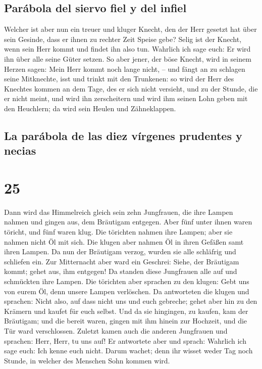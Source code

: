 \hypertarget{paruxe1bola-del-siervo-fiel-y-del-infiel}{%
\subsection{Parábola del siervo fiel y del
infiel}\label{paruxe1bola-del-siervo-fiel-y-del-infiel}}

 Welcher ist aber nun ein treuer und kluger Knecht, den
der Herr gesetzt hat über sein Gesinde, dass er ihnen zu rechter Zeit
Speise gebe?  Selig ist der Knecht, wenn sein Herr kommt
und findet ihn also tun.  Wahrlich ich sage euch: Er wird
ihn über alle seine Güter setzen.  So aber jener, der
böse Knecht, wird in seinem Herzen sagen: Mein Herr kommt noch lange
nicht, --  und fängt an zu schlagen seine Mitknechte,
isst und trinkt mit den Trunkenen:  so wird der Herr des
Knechtes kommen an dem Tage, des er sich nicht versieht, und zu der
Stunde, die er nicht meint,  und wird ihn zerscheitern
und wird ihm seinen Lohn geben mit den Heuchlern; da wird sein Heulen
und Zähneklappen.

\hypertarget{la-paruxe1bola-de-las-diez-vuxedrgenes-prudentes-y-necias}{%
\subsection{La parábola de las diez vírgenes prudentes y
necias}\label{la-paruxe1bola-de-las-diez-vuxedrgenes-prudentes-y-necias}}

\hypertarget{section-24}{%
\section{25}\label{section-24}}

 Dann wird das Himmelreich gleich sein zehn Jungfrauen,
die ihre Lampen nahmen und gingen aus, dem Bräutigam entgegen.
 Aber fünf unter ihnen waren töricht, und fünf waren klug.
 Die törichten nahmen ihre Lampen; aber sie nahmen nicht
Öl mit sich.  Die klugen aber nahmen Öl in ihren Gefäßen
samt ihren Lampen.  Da nun der Bräutigam verzog, wurden
sie alle schläfrig und schliefen ein.  Zur Mitternacht
aber ward ein Geschrei: Siehe, der Bräutigam kommt; gehet aus, ihm
entgegen!  Da standen diese Jungfrauen alle auf und
schmückten ihre Lampen.  Die törichten aber sprachen zu
den klugen: Gebt uns von eurem Öl, denn unsere Lampen verlöschen.
 Da antworteten die klugen und sprachen: Nicht also, auf
dass nicht uns und euch gebreche; gehet aber hin zu den Krämern und
kaufet für euch selbst.  Und da sie hingingen, zu kaufen,
kam der Bräutigam; und die bereit waren, gingen mit ihm hinein zur
Hochzeit, und die Tür ward verschlossen.  Zuletzt kamen
auch die anderen Jungfrauen und sprachen: Herr, Herr, tu uns auf!
 Er antwortete aber und sprach: Wahrlich ich sage euch:
Ich kenne euch nicht.  Darum wachet; denn ihr wisset
weder Tag noch Stunde, in welcher des Menschen Sohn kommen wird.

